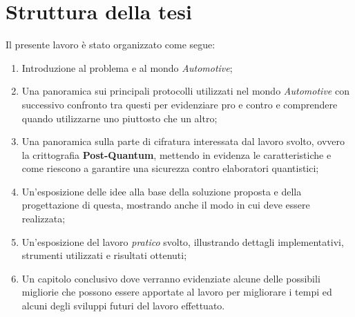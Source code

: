 \section{Struttura della tesi}
Il presente lavoro è stato organizzato come segue:
\begin{enumerate}
    \item Introduzione al problema e al mondo \emph{Automotive};
    \item Una panoramica sui principali protocolli utilizzati nel mondo \emph{Automotive} con successivo confronto tra questi per evidenziare pro e contro e comprendere quando utilizzarne uno piuttosto che un altro;
    \item Una panoramica sulla parte di cifratura interessata dal lavoro svolto, ovvero la crittografia \textbf{Post-Quantum}, mettendo in evidenza le caratteristiche e come riescono a garantire una sicurezza contro elaboratori quantistici;
    \item Un'esposizione delle idee alla base della soluzione proposta e della progettazione di questa, mostrando anche il modo in cui deve essere realizzata;
    \item Un'esposizione del lavoro \emph{pratico} svolto, illustrando dettagli implementativi, strumenti utilizzati e risultati ottenuti;
    \item Un capitolo conclusivo dove verranno evidenziate alcune delle possibili migliorie che possono essere apportate al lavoro per migliorare i tempi ed alcuni degli sviluppi futuri del lavoro effettuato.
\end{enumerate}